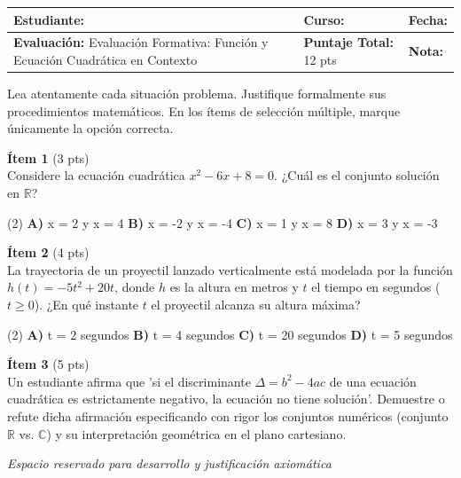 \documentclass[11pt,letterpaper]{article}
\begin{document}
\noindent
\begin{tabularx}{\textwidth}{|X|l|l|}
\hline
\textbf{Estudiante:} & \textbf{Curso:} & \textbf{Fecha:} \\
\hline
\textbf{Evaluación:} Evaluación Formativa: Función y Ecuación Cuadrática en Contexto & \textbf{Puntaje Total:} 12 pts & \textbf{Nota:} \\
\hline
\end{tabularx}

\vspace{0.4cm}

\begin{cajainstruccion}
Lea atentamente cada situación problema. Justifique formalmente sus procedimientos matemáticos. En los ítems de selección múltiple, marque únicamente la opción correcta.
\end{cajainstruccion}

\vspace{0.4cm}

\noindent \textbf{Ítem 1} (3 pts)\\
Considere la ecuación cuadrática $x^2 - 6x + 8 = 0$. ¿Cuál es el conjunto solución en $\mathbb{R}$?

\begin{tasks}(2)
  \task \textbf{A)} x = 2 y x = 4
  \task \textbf{B)} x = -2 y x = -4
  \task \textbf{C)} x = 1 y x = 8
  \task \textbf{D)} x = 3 y x = -3
\end{tasks}

\vspace{0.4cm}

\noindent \textbf{Ítem 2} (4 pts)\\
La trayectoria de un proyectil lanzado verticalmente está modelada por la función $h(t) = -5t^2 + 20t$, donde $h$ es la altura en metros y $t$ el tiempo en segundos ($t \geq 0$). ¿En qué instante $t$ el proyectil alcanza su altura máxima?

\begin{tasks}(2)
  \task \textbf{A)} t = 2 segundos
  \task \textbf{B)} t = 4 segundos
  \task \textbf{C)} t = 20 segundos
  \task \textbf{D)} t = 5 segundos
\end{tasks}

\vspace{0.4cm}

\noindent \textbf{Ítem 3} (5 pts)\\
Un estudiante afirma que 'si el discriminante $\Delta = b^2 - 4ac$ de una ecuación cuadrática es estrictamente negativo, la ecuación no tiene solución'. Demuestre o refute dicha afirmación especificando con rigor los conjuntos numéricos (conjunto $\mathbb{R}$ vs. $\mathbb{C}$) y su interpretación geométrica en el plano cartesiano.

\vspace{0.2cm}
\begin{tcolorbox}[colback=white,colframe=neutralGray,arc=1mm,boxrule=0.5pt,height=4.5cm,valign=top]
{\footnotesize\color{gray}\textit{Espacio reservado para desarrollo y justificación axiomática}}
\end{tcolorbox}

\vspace{0.4cm}
\end{document}
